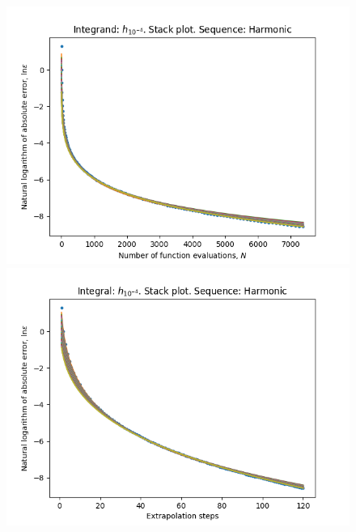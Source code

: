 \begin{figure}[H]
\centering
\begin{minipage}{0.45\textwidth}
\centering
\includegraphics[scale=0.45]{../results/romberg_plots/h_tenthousandth_hp_harmonic_stack.png}
\end{minipage}
\begin{minipage}{0.45\textwidth}
\centering
\includegraphics[scale=0.45]{../results/romberg_plots/h_tenthousandth_hp_harmonic_steps_stack.png}
\end{minipage}
\end{figure}

